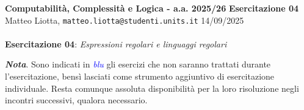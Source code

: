 \documentclass[a4paper,10pt]{article}
\newcommand{\EsercitazioneNum}{04}
\newcommand{\Data}{14/09/2025}
\begin{document}
\footnotesize  %

\noindent
\small \textbf{Computabilità, Complessità e Logica - a.a. 2025/26} \hfill \textbf{Esercitazione \EsercitazioneNum} \\[0.2cm]
\scriptsize Matteo Liotta, \texttt{matteo.liotta@studenti.units.it} \hfill \Data \\[0.2cm]

\noindent\makebox[\linewidth]{\rule{\linewidth}{0.4pt}} \\[1cm]


\noindent\Large \textbf{Esercitazione \EsercitazioneNum}: \textit{Espressioni regolari e linguaggi regolari}
\begin{osservazioni}
    \textbf{\textit{Nota}}. Sono indicati in \textcolor{blue}{\textit{blu}} gli esercizi che non saranno trattati durante l'esercitazione, bensì lasciati come strumento aggiuntivo di esercitazione individuale. Resta comunque assoluta disponibilità per la loro risoluzione negli incontri successivi, qualora necessario.
\end{osservazioni}
\end{document}
